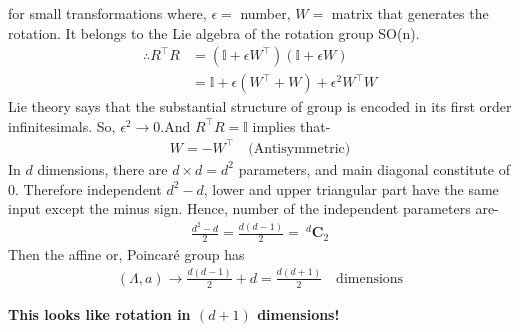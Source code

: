 \documentclass[14pt]{article} %
\begin{document}
for small transformations where, $\epsilon =$ number, $W=$ matrix that generates the rotation. It belongs to the Lie algebra of the rotation group SO(n).
\begin{align*}
\therefore R^\top R &= (\mathbb{I} + \epsilon W^\top)(\mathbb{I} + \epsilon W) \\
&= \mathbb{I} + \epsilon(W^\top + W) + \epsilon^2 W^\top W 
\end{align*}
Lie theory says that the substantial structure of group is encoded in its first order infinitesimals. So, $\epsilon^2 \rightarrow0$.And $R^\top R = \mathbb{I}$ implies that-
\begin{align*}
W = -W^\top \quad \text{(Antisymmetric)}
\end{align*}
In $d$ dimensions, there are $d \times d = d^2$ parameters, and main diagonal constitute of 0. Therefore independent $d^2 -d$, lower and upper triangular part have the same input except the minus sign.
Hence, number of the independent parameters are-
\begin{align*}
\frac{d^2 -d }{2} = \frac{d(d-1)}{2} = ~^d\mathbf{C}_2
\end{align*}
Then the affine or, Poincaré group has 
\begin{align*}
(\Lambda,a) \rightarrow \frac{d(d-1)}{2} + d = \frac{d(d+1)}{2} \quad \text{dimensions}
\end{align*}
\begin{center}
    \textbf{This looks like rotation in $(d + 1)$ dimensions!}
\end{center}
\end{document}
